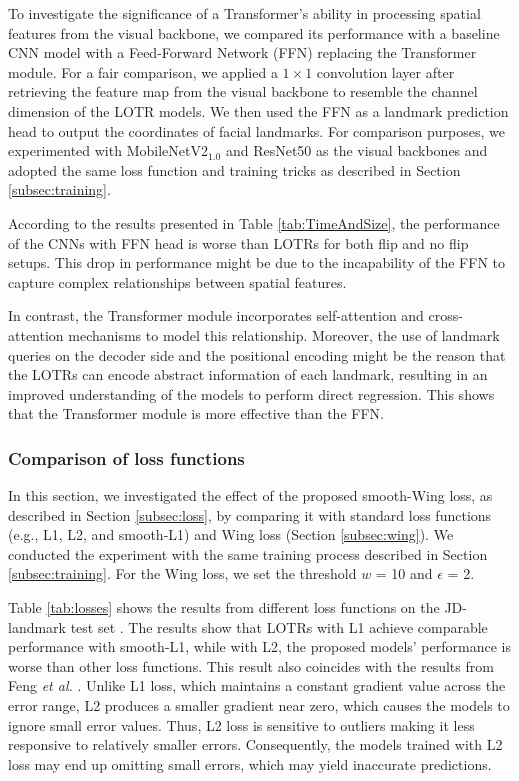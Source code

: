 \documentclass[journal]{IEEEtran}
\begin{document}
To investigate the significance of a Transformer's ability in processing spatial features from the visual backbone, we compared its performance with a baseline CNN model with a Feed-Forward Network (FFN) replacing the Transformer module.
For a fair comparison, we applied a $1\times1$ convolution layer after retrieving the feature map from the visual backbone to resemble the channel dimension of the LOTR models.
We then used the FFN as a landmark prediction head to output the coordinates of facial landmarks. 
For comparison purposes, we experimented with MobileNetV2$_{1.0}$ and ResNet50 as the visual backbones and adopted the same loss function and training tricks as described in Section \ref{subsec:training}.

According to the results presented in Table \ref{tab:TimeAndSize}, the performance of the CNNs with FFN head is worse than LOTRs for both flip and no flip setups.
This drop in performance might be due to the incapability of the FFN to capture complex relationships between spatial features.

In contrast, the Transformer module incorporates self-attention and cross-attention mechanisms to model this relationship.
Moreover, the use of landmark queries on the decoder side and the positional encoding might be the reason that the LOTRs can encode abstract information of each landmark, resulting in an improved understanding of the models to perform direct regression.
This shows that the Transformer module is more effective than the FFN.



\subsubsection{Comparison of loss functions}\label{subsubsec:ablation_loss}

In this section, we investigated the effect of the proposed smooth-Wing loss, as described in Section \ref{subsec:loss}, by comparing it with standard loss functions (e.g., L1, L2, and smooth-L1) and Wing loss (Section \ref{subsec:wing}).
We conducted the experiment with the same training process described in Section \ref{subsec:training}.
For the Wing loss, we set the threshold $w$ = 10 and $\epsilon$ = 2.

Table \ref{tab:losses} shows the results from different loss functions on the JD-landmark test set \cite{liu2019}.
The results show that LOTRs with L1 achieve comparable performance with smooth-L1, while with L2, the proposed models' performance is worse than other loss functions.
This result also coincides with the results from Feng \textit{et al.} \cite{Feng2017}.
Unlike L1 loss, which maintains a constant gradient value across the error range, L2 produces a smaller gradient near zero, which causes the models to ignore small error values.
Thus, L2 loss is sensitive to outliers making it less responsive to relatively smaller errors.
Consequently, the models trained with L2 loss may end up omitting small errors, which may yield inaccurate predictions.
\end{document}

